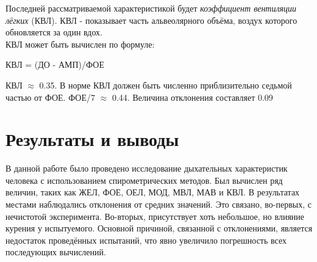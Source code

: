 \documentclass{article}
\begin{document}
        Последней рассматриваемой характеристикой будет \textit{коэффициент вентиляции лёгких} (КВЛ).
        КВЛ - показывает часть альвеолярного объёма, воздух которого
        обновляется за один вдох.\\

        КВЛ может быть вычислен по формуле:
        
        \begin{center}
            КВЛ = (ДО - АМП)/ФОЕ
        \end{center}

        КВЛ $\approx$ 0.35. В норме КВЛ должен быть численно приблизительно седьмой частью от ФОЕ.
        ФОЕ/7 $\approx$ 0.44. Величина отклонения составляет 0.09
    \newpage

    \section*{Результаты и выводы}

        \hspace*{4mm} В данной работе было проведено исследование дыхательных характеристик человека
        с использованием спирометрических методов. Был вычислен ряд величин, таких как ЖЕЛ, ФОЕ,
        ОЕЛ, МОД, МВЛ, МАВ и КВЛ. В результатах местами наблюдались отклонения от средних значений.
        Это связано, во-первых, с нечистотой эксперимента. Во-вторых, присутствует хоть небольшое, но влияние курения у испытуемого.
        Основной причиной, связанной с отклонениями, является недостаток проведённых испытаний, что явно увеличило
        погрешность всех последующих вычислений.
        
\end{document}

